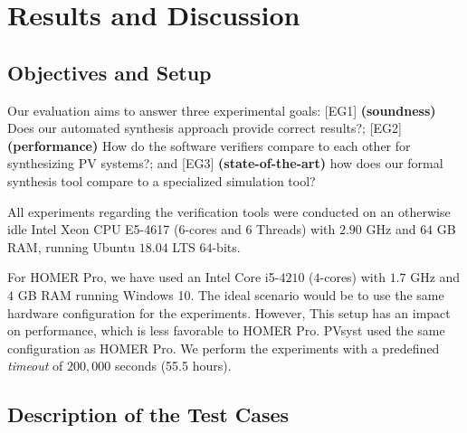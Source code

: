 \documentclass[10pt,journal,compsoc]{IEEEtran}
\begin{document}
\section{Results and Discussion}

\subsection{Objectives and Setup}
\label{ObjectivesAndSetup}

Our evaluation aims to answer three experimental goals: [EG1] \textbf{(soundness)} Does our automated synthesis approach provide correct results?; [EG2] \textbf{(performance)} How do the software verifiers compare to each other for synthesizing PV systems?; and [EG3] \textbf{(state-of-the-art)} how does our formal synthesis tool compare to a specialized simulation tool?

  All experiments regarding the verification tools were conducted on an otherwise idle Intel Xeon CPU E5-4617 ($6$-cores and 6 Threads) with $2.90$ GHz and $64$ GB RAM, running Ubuntu $18.04$ LTS $64$-bits. 

For HOMER Pro, we have used an Intel Core i5-$4210$ ($4$-cores) with $1.7$ GHz and $4$ GB RAM running Windows 10. The ideal scenario would be to use the same hardware configuration for the experiments. However, This setup has an impact on performance, which is less favorable to HOMER Pro. PVsyst used the same configuration as HOMER Pro. We perform the experiments with a predefined \textit{timeout} of $200,000$ seconds (55.5 hours).\color{black}

\subsection{Description of the Test Cases}
\end{document}
